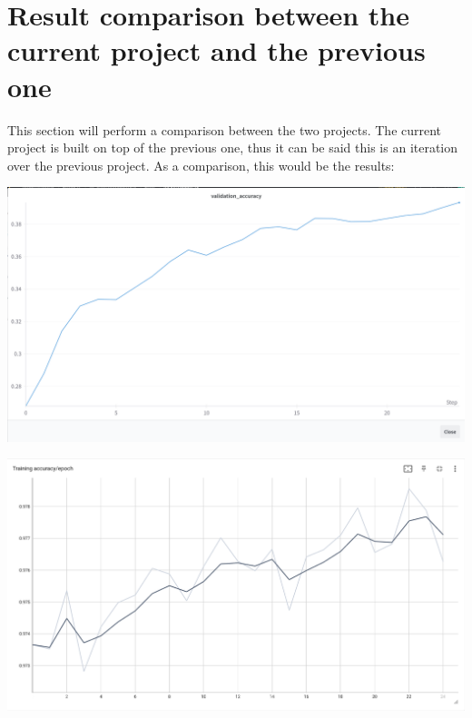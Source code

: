 \documentclass[conference]{IEEEtran}
\begin{document}
\section{Result comparison between the current project and the previous one}
This section will perform a comparison between the two projects. The current project is built on top of the previous one,
thus it can be said this is an iteration over the previous project. As a comparison, this would be the results:

\begin{center}
    \begin{minipage}{0.75\linewidth}
        \includegraphics[width=\linewidth]{resources/previous_validation_accuracy_graph.png}
    \end{minipage}
\end{center}

\begin{center}
    \begin{minipage}{0.75\linewidth}
        \includegraphics[width=\linewidth]{resources/validation_accuracy_graph.png}
    \end{minipage}
\end{center}
\end{document}
